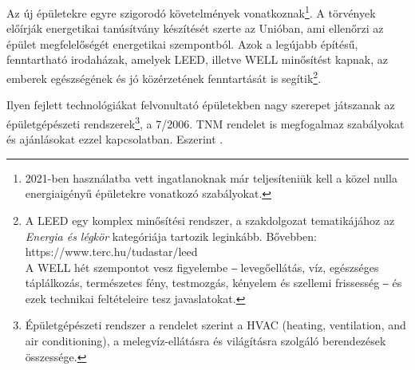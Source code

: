 Az új épületekre egyre szigorodó követelmények vonatkoznak\footnote{2021-ben használatba vett ingatlanoknak már teljesíteniük kell a közel nulla energiaigényű épületekre \cite{NZEB} vonatkozó szabályokat. }.
A törvények előírják energetikai tanúsítvány készítését szerte az Unióban, ami ellenőrzi az épület megfelelőségét energetikai szempontból.
Azok a legújabb építésű, fenntartható irodaházak, amelyek LEED, illetve WELL minősítést kapnak, az emberek egészségének és jó közérzetének fenntartását is segítik\footnote{A LEED %
egy komplex minősítési rendszer, a szakdolgozat tematikájához az \textit{Energia és légkör} kategóriája tartozik leginkább. Bővebben: https://www.terc.hu/tudastar/leed \\
A WELL hét szempontot vesz figyelembe ‒ levegőellátás, víz, egészséges táplálkozás, természetes fény, testmozgás, kényelem és szellemi frissesség ‒ és ezek technikai feltételeire tesz javaslatokat.}.

Ilyen fejlett technológiákat felvonultató épületekben nagy szerepet játszanak az épületgépészeti rendszerek\footnote{Épületgépészeti rendszer a \cite{TNM2006} rendelet szerint a  HVAC (heating, ventilation, and air conditioning), a melegvíz-ellátásra és világításra szolgáló berendezések összessége.},
a 7/2006. TNM rendelet \cite{TNM2006} is megfogalmaz szabályokat és ajánlásokat ezzel kapcsolatban. Eszerint . 
\vspace{10pt}
\pagebreak




